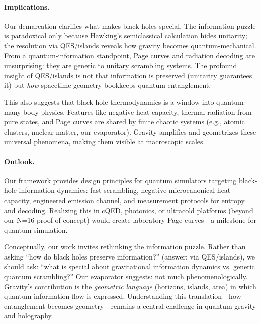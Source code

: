 \documentclass[aps,prx,onecolumn,showpacs,superscriptaddress,longbibliography,nofootinbib]{revtex4-2}
\begin{document}
\paragraph{Implications.}
Our demarcation clarifies what makes black holes special. The information puzzle is paradoxical only because Hawking's semiclassical calculation hides unitarity; the resolution via QES/islands reveals how gravity becomes quantum-mechanical. From a quantum-information standpoint, Page curves and radiation decoding are unsurprising: they are generic to unitary scrambling systems. The profound insight of QES/islands is not that information is preserved (unitarity guarantees it) but \emph{how} spacetime geometry bookkeeps quantum entanglement.

This also suggests that black-hole thermodynamics is a window into quantum many-body physics. Features like negative heat capacity, thermal radiation from pure states, and Page curves are shared by finite chaotic systems (e.g., atomic clusters, nuclear matter, our evaporator). Gravity amplifies and geometrizes these universal phenomena, making them visible at macroscopic scales.

\paragraph{Outlook.}
Our framework provides design principles for quantum simulators targeting black-hole information dynamics: fast scrambling, negative microcanonical heat capacity, engineered emission channel, and measurement protocols for entropy and decoding. Realizing this in cQED, photonics, or ultracold platforms (beyond our N=16 proof-of-concept) would create laboratory Page curves---a milestone for quantum simulation.

Conceptually, our work invites rethinking the information puzzle. Rather than asking ``how do black holes preserve information?'' (answer: via QES/islands), we should ask: ``what is special about gravitational information dynamics vs. generic quantum scrambling?'' Our evaporator suggests: not much phenomenologically. Gravity's contribution is the \emph{geometric language} (horizons, islands, area) in which quantum information flow is expressed. Understanding this translation---how entanglement becomes geometry---remains a central challenge in quantum gravity and holography.
\end{document}
